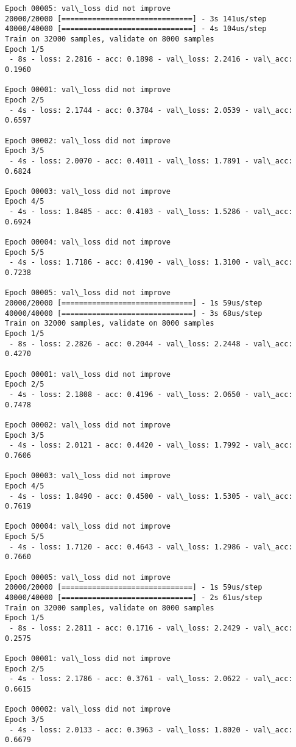 \documentclass[11pt]{article}
\begin{document}
\begin{Verbatim}[commandchars=\\\{\}]
Epoch 00005: val\_loss did not improve
20000/20000 [==============================] - 3s 141us/step
40000/40000 [==============================] - 4s 104us/step
Train on 32000 samples, validate on 8000 samples
Epoch 1/5
 - 8s - loss: 2.2816 - acc: 0.1898 - val\_loss: 2.2416 - val\_acc: 0.1960

Epoch 00001: val\_loss did not improve
Epoch 2/5
 - 4s - loss: 2.1744 - acc: 0.3784 - val\_loss: 2.0539 - val\_acc: 0.6597

Epoch 00002: val\_loss did not improve
Epoch 3/5
 - 4s - loss: 2.0070 - acc: 0.4011 - val\_loss: 1.7891 - val\_acc: 0.6824

Epoch 00003: val\_loss did not improve
Epoch 4/5
 - 4s - loss: 1.8485 - acc: 0.4103 - val\_loss: 1.5286 - val\_acc: 0.6924

Epoch 00004: val\_loss did not improve
Epoch 5/5
 - 4s - loss: 1.7186 - acc: 0.4190 - val\_loss: 1.3100 - val\_acc: 0.7238

Epoch 00005: val\_loss did not improve
20000/20000 [==============================] - 1s 59us/step
40000/40000 [==============================] - 3s 68us/step
Train on 32000 samples, validate on 8000 samples
Epoch 1/5
 - 8s - loss: 2.2826 - acc: 0.2044 - val\_loss: 2.2448 - val\_acc: 0.4270

Epoch 00001: val\_loss did not improve
Epoch 2/5
 - 4s - loss: 2.1808 - acc: 0.4196 - val\_loss: 2.0650 - val\_acc: 0.7478

Epoch 00002: val\_loss did not improve
Epoch 3/5
 - 4s - loss: 2.0121 - acc: 0.4420 - val\_loss: 1.7992 - val\_acc: 0.7606

Epoch 00003: val\_loss did not improve
Epoch 4/5
 - 4s - loss: 1.8490 - acc: 0.4500 - val\_loss: 1.5305 - val\_acc: 0.7619

Epoch 00004: val\_loss did not improve
Epoch 5/5
 - 4s - loss: 1.7120 - acc: 0.4643 - val\_loss: 1.2986 - val\_acc: 0.7660

Epoch 00005: val\_loss did not improve
20000/20000 [==============================] - 1s 59us/step
40000/40000 [==============================] - 2s 61us/step
Train on 32000 samples, validate on 8000 samples
Epoch 1/5
 - 8s - loss: 2.2811 - acc: 0.1716 - val\_loss: 2.2429 - val\_acc: 0.2575

Epoch 00001: val\_loss did not improve
Epoch 2/5
 - 4s - loss: 2.1786 - acc: 0.3761 - val\_loss: 2.0622 - val\_acc: 0.6615

Epoch 00002: val\_loss did not improve
Epoch 3/5
 - 4s - loss: 2.0133 - acc: 0.3963 - val\_loss: 1.8020 - val\_acc: 0.6679


\end{Verbatim}
\end{document}
